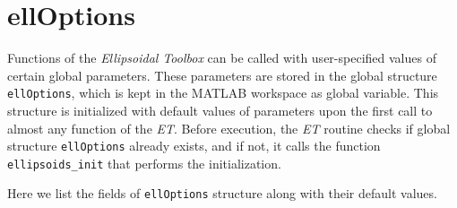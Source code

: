 \section{ellOptions}
Functions of the {\it Ellipsoidal Toolbox} can be called with
user-specified values of certain global parameters. These parameters
are stored in the global structure {\tt ellOptions}, which is kept in the
MATLAB workspace as global variable. This structure is initialized with
default values of parameters upon the first call to almost any function
of the {\it ET}. Before  execution, the {\it ET} routine checks
if global structure {\tt ellOptions} already exists, and if not, it calls
the function {\tt ellipsoids\_init} that performs the initialization.

Here we list the fields of {\tt ellOptions} structure along with their
default values.
